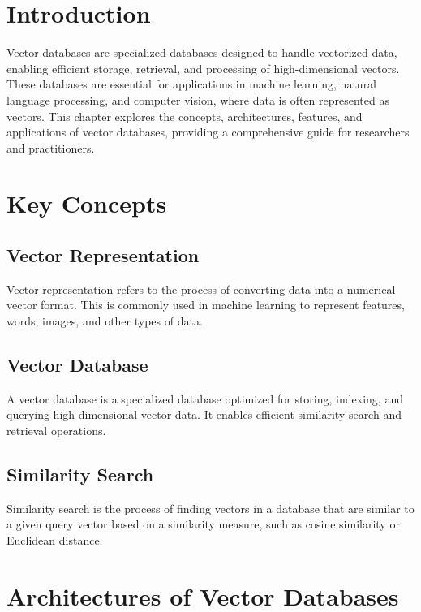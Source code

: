 \section{Introduction}
Vector databases are specialized databases designed to handle vectorized data, enabling efficient storage, retrieval, and processing of high-dimensional vectors. These databases are essential for applications in machine learning, natural language processing, and computer vision, where data is often represented as vectors. This chapter explores the concepts, architectures, features, and applications of vector databases, providing a comprehensive guide for researchers and practitioners.

\section{Key Concepts}

\subsection{Vector Representation}
Vector representation refers to the process of converting data into a numerical vector format. This is commonly used in machine learning to represent features, words, images, and other types of data.

\subsection{Vector Database}
A vector database is a specialized database optimized for storing, indexing, and querying high-dimensional vector data. It enables efficient similarity search and retrieval operations.

\subsection{Similarity Search}
Similarity search is the process of finding vectors in a database that are similar to a given query vector based on a similarity measure, such as cosine similarity or Euclidean distance.

\section{Architectures of Vector Databases}

